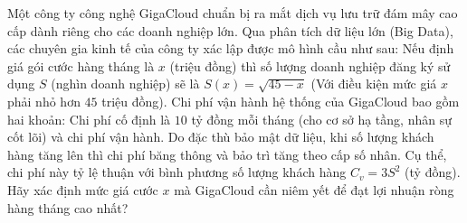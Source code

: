 \begin{ex}%
	Một công ty công nghệ GigaCloud chuẩn bị ra mắt dịch vụ lưu trữ đám mây cao cấp dành riêng cho các doanh nghiệp lớn. Qua phân tích dữ liệu lớn (Big Data), các chuyên gia kinh tế của công ty xác lập được mô hình cầu như sau: Nếu định giá gói cước hàng tháng là $x$ (triệu đồng) thì số lượng doanh nghiệp đăng ký sử dụng $S$ (nghìn doanh nghiệp) sẽ là $S(x)=\sqrt{45-x}$ (Với điều kiện mức giá $x$ phải nhỏ hơn $45$ triệu đồng). Chi phí vận hành hệ thống của GigaCloud bao gồm hai khoản: Chi phí cố định là $10$ tỷ đồng mỗi tháng (cho cơ sở hạ tầng, nhân sự cốt lõi) và chi phí vận hành. Do đặc thù bảo mật dữ liệu, khi số lượng khách hàng tăng lên thì chi phí băng thông và bảo trì tăng theo cấp số nhân. Cụ thể, chi phí này tỷ lệ thuận với bình phương số lượng khách hàng $C_{v}=3S^{2}$ (tỷ đồng). Hãy xác định mức giá cước $x$ mà GigaCloud cần niêm yết để đạt lợi nhuận ròng hàng tháng cao nhất?
	
\end{ex}


